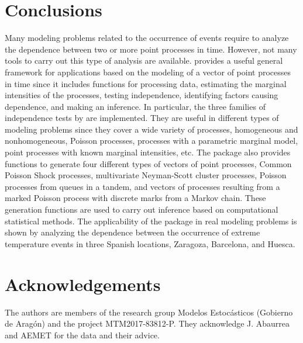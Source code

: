 											
\section{Conclusions}


Many modeling problems  related to the occurrence of events require  to analyze the dependence between two or more point processes in time. However, not many tools  to carry out this type of analysis are available.
 provides a  useful general framework for applications based on the modeling of a vector of point processes in time since it includes functions   for  processing  data,  estimating the marginal intensities of the processes,   testing independence, identifying factors causing  dependence, and  making an inference. In particular,  the three families of independence tests by \citet{Cebrian20} are implemented. They are  useful in different types of modeling problems  since they cover a wide variety of  processes, homogeneous and nonhomogeneous,  Poisson processes, processes with a  parametric marginal model,  point  processes with  known marginal intensities,  etc.  The package also provides functions to generate  four different types of  vectors of point processes,  Common Poisson Shock processes,  multivariate Neyman-Scott cluster processes,  Poisson processes from queues in a tandem, and  vectors of processes  resulting from a marked Poisson process with discrete marks from  a Markov chain. These generation functions  are used to carry out inference based on computational statistical  methods. The applicability of the package in real modeling problems is shown by analyzing the dependence between the occurrence of extreme temperature events in three Spanish locations, Zaragoza, Barcelona, and Huesca.


\section{Acknowledgements}
	
The authors are members of the research group Modelos Estoc\'asticos (Gobierno de Aragón) and the project MTM2017-83812-P. They   acknowledge  J. Abaurrea and AEMET for the data and their  advice. 
																				




\address{Ana C. Cebri\'an\\
  University of Zaragoza \\
  Dpto. M\'etodos Estadísticos. Ed. Matemáticas. C Pedro Cerbuna, 12. Zaragoza 50009\\
  Spain \\
  ORCiD: 0000-0002-9052-9674 \\
}

\address{Jesús Asín\\
	University of Zaragoza \\
	Dpto. M\'etodos Estadísticos. EINA. C María de Luna, 3. Zaragoza 50018         \\
    Spain 
}


